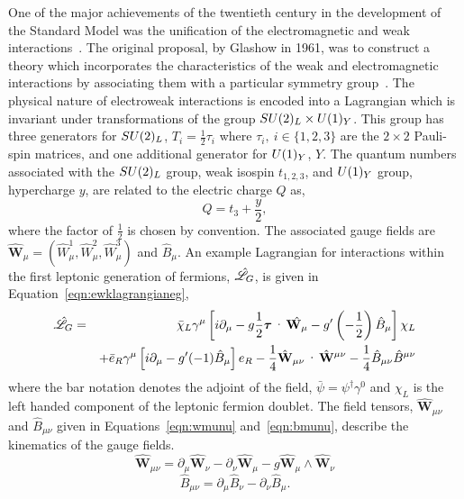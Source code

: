 One of the major achievements of the twentieth century in 
the development of the Standard Model was the unification of the electromagnetic 
and weak interactions~\citep{glashow,weinberg,salam}. 
The original proposal, by Glashow in 1961, was
to construct a theory which incorporates the characteristics of 
the weak and electromagnetic interactions by associating them 
with a particular symmetry group~\citep{glashow}.
The physical nature of electroweak interactions is encoded into a Lagrangian which 
is invariant under transformations of the group $SU(2)_{L}\times U(1)_{Y}$. 
This group has three generators for $SU(2)_{L}$, $T_{i} = \frac{1}{2}\tau_{i}$ 
where $\tau_{i},~i\in \{1,2,3 \}$ are the $2\times2$ Pauli-spin matrices, and one
additional generator for $U(1)_{Y}$, $Y$.
The quantum numbers associated with the $SU(2)_{L}$ group, weak isospin $t_{1,2,3}$, and 
$U(1)_{Y}$ group, hypercharge $y$, are related to the electric charge $Q$ as,
\begin{equation}
Q = t_{3}+\frac{y}{2},
\end{equation} 
where the factor of $\frac{\displaystyle 1}{\displaystyle 2}$ is chosen by convention.
The associated gauge fields are 
$\hat{\mathbf{W}}_{\mu} = \left(\hat{W}_{\mu}^{1},\hat{W}_{\mu}^{2},\hat{W}_{\mu}^{3}\right)$
 and $\hat{B}_{\mu}$.
An example Lagrangian for interactions within the first leptonic generation of fermions, $\hat{\mathscr{L}}_{G}$, is 
given in Equation~\ref{eqn:ewklagrangianeg},
\begin{eqnarray}
\lagr_{G} & =& \bar{\chi}_{L}\gamma^{\mu}\left[i\partial_{\mu} 
		   - g\frac{1}{2}\boldsymbol{\tau}\cdot\hat{\mathbf{W}_{\mu}}
		   - g^{\prime}\left(-\frac{1}{2}\right)\hat{B}_{\mu}\right] \chi_{L}
\nonumber \\
& &		   + \bar{e}_{R}\gamma^{\mu}\left[i\partial_{\mu} 
		   - g^{\prime}(-1)\hat{B}_{\mu}\right]{e}_{R}
		     -\frac{1}{4}
		     \hat{\mathbf{W}}_{\mu\nu}\cdot\hat{\mathbf{W}}^{\mu\nu} 
		     -\frac{1}{4}
		     \hat{B}_{\mu\nu}\hat{B}^{\mu\nu}
\label{eqn:ewklagrangianeg}
\end{eqnarray}
where the bar notation denotes the adjoint of the field, $\bar{\psi}=\psi^{\dagger}\gamma^{0}$ and 
$\chi_{L}$ is the left handed component of the leptonic fermion doublet.
The field tensors, $\hat{\mathbf{W}}_{\mu\nu}$ and $\hat{B}_{\mu\nu}$ given in 
Equations~\ref{eqn:wmunu} and~\ref{eqn:bmunu},
describe the kinematics of the gauge fields.
\begin{equation}
\hat{\mathbf{W}}_{\mu\nu} = \partial_{\mu}\hat{\mathbf{W}}_{\nu} - \partial_{\nu}\hat{\mathbf{W}}_{\mu} - g \hat{\mathbf{W}}_{\mu}\wedge\hat{\mathbf{W}}_{\nu}
\label{eqn:wmunu}
\end{equation}
\begin{equation}
\hat{B}_{\mu\nu} = \partial_{\mu}\hat{B}_{\nu} - \partial_{\nu}\hat{B}_{\mu}.
\label{eqn:bmunu}
\end{equation}

